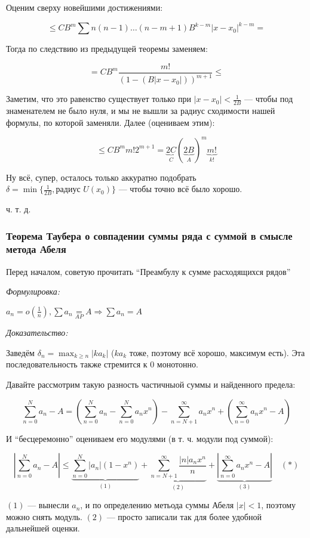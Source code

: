 \documentclass{article}
\def\eqby#1{\underset{#1}{=}}
\begin{document}
Оценим сверху новейшими достижениями: 

\[\le CB^m\sum n(n - 1)\ldots(n - m + 1)B^{k - m}|x - x_0|^{k - m} = \]

Тогда по следствию из предыдущей теоремы заменяем: 

\[ = CB^m\frac{m!}{(1 - (B|x - x_0|))^{m + 1}} \le\]

Заметим, что это равенство существует только при $|x - x_0| < \frac{1}{2B}$ --- чтобы под знаменателем не было нуля, и мы не вышли за радиус сходимости нашей формулы, по которой заменяли. Далее (оцениваем этим): 

\[\le CB^mm!2^{m + 1} = \underbrace{2C}_{C}(\underbrace{2B}_{A})^m\underbrace{m!}_{k!}\]

Ну всё, супер, осталось только аккуратно подобрать $\delta = \min\{\frac{1}{2B}, \text{радиус } U(x_0)\}$ --- чтобы точно всё было хорошо.

ч. т. д. 

\subsubsection{Теорема Таубера о совпадении суммы ряда с суммой в смысле метода Абеля}

Перед началом, советую прочитать ``Преамбулу к сумме расходящихся рядов''

\textit{Формулировка:}

$a_n = o(\frac{1}{n}), \sum a_n \eqby{AP} A \Rightarrow \sum a_n = A$

\textit{Доказательство:}

Заведём $\delta_n = \max_{k \ge n} |ka_k|$ ($ka_k$ тоже, поэтому всё хорошо, максимум есть). Эта последовательность также стремится к 0 монотонно.

Давайте рассмотрим такую разность частичныой суммы и найденного предела:

\[\sum_{n = 0}^{N} a_n - A = \left(\sum_{n = 0}^{N} a_n - \sum_{n = 0}^{N} a_n x^n\right) - \sum_{n = N + 1}^{\infty} a_n x^n + \left(\sum_{n = 0}^{\infty} a_n x^n - A\right)\]

И ``бесцеремонно'' оцениваем его модулями (в т. ч. модули под суммой): 

\[\left|\sum_{n = 0}^{N} a_n - A\right| \le \underbrace{\sum_{n = 0}^{N} |a_n|(1 - x^n)}_{(1)} + \underbrace{\sum_{n = N + 1}^{\infty} \frac{|n|a_n x^n}{n}}_{(2)} + \underbrace{\left|\sum_{n = 0}^{\infty} a_n x^n - A\right|}_{(3)} \quad (*)\]

$(1)$ --- вынесли $a_n$, и по определению метьода суммы Абеля $|x| < 1$, поэтому можно снять модуль. $(2)$ --- просто записали так для более удобной дальнейшей оценки. 
\end{document}
